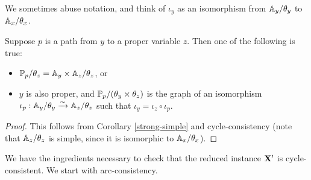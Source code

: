 \documentclass[letterpaper,11pt]{article}
\begin{document}
We sometimes abuse notation, and think of $\iota_y$ as an isomorphism from $\mathbb{A}_y/\theta_y$ to $\mathbb{A}_x/\theta_x$.

\begin{lem}\label{ancestral-proper-path} Suppose $p$ is a path from $y$ to a proper variable $z$. Then one of the following is true:
\begin{itemize}
\item $\mathbb{P}_p/\theta_z = \mathbb{A}_y \times \mathbb{A}_z/\theta_z$, or

\item $y$ is also proper, and $\mathbb{P}_p/(\theta_y\times\theta_z)$ is the graph of an isomorphism $\iota_p : \mathbb{A}_y/\theta_y \xrightarrow{\sim} \mathbb{A}_z/\theta_z$ such that $\iota_y = \iota_z \circ \iota_p$.
\end{itemize}
\end{lem}
\begin{proof} This follows from Corollary \ref{strong-simple} and cycle-consistency (note that $\mathbb{A}_z/\theta_z$ is simple, since it is isomorphic to $\mathbb{A}_x/\theta_x$).
\end{proof}

We have the ingredients necessary to check that the reduced instance $\mathbf{X}'$ is cycle-consistent. We start with arc-consistency.
\end{document}
